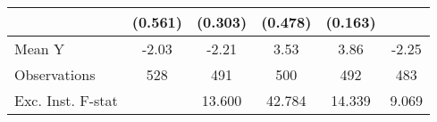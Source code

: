 {\begin{tabular}{l*{5}{c}}
            &     (0.561)         &     (0.303)         &     (0.478)         &     (0.163)         &                     \\
\midrule
Mean Y      &       -2.03         &       -2.21         &        3.53         &        3.86         &       -2.25         \\
Observations&         528         &         491         &         500         &         492         &         483         \\
Exc. Inst. F-stat&                     &      13.600         &      42.784         &      14.339         &       9.069         \\
\bottomrule
\end{tabular}
}
